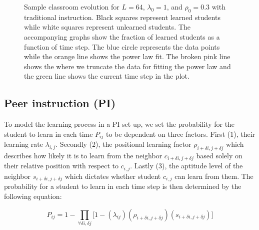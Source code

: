 \begin{figure}[htbp!]

    \caption{Sample classroom evolution for $L=64$, $\lambda_0 = 1$, and $\rho_0 = 0.3$ with traditional instruction. 
    Black squares represent learned students while white squares represent unlearned students. 
    The accompanying graphs show the fraction of learned students as a function of time step. 
    The blue circle represents the data points while the orange line shows the power law fit. 
    The broken pink line shows the where we truncate the data for fitting the power law and the green line shows the current time step in the plot.
    }
    \label{fig:2DBPCA traditional classroom evolution}
 \end{figure}

\subsection{Peer instruction (PI)}
To model the learning process in a PI set up, we set the probability for the student to learn in each time $P_{ij}$ to be dependent on three factors.
First (1), their learning rate $\lambda_{i,j}$. 
Secondly (2), the positional learning factor $\rho_{i+\delta i, j+\delta j}$ which describes how likely it is to learn from the neighbor $c_{i+\delta i, j+\delta j}$ based solely on their relative position with respect to $c_{i,j}$. 
Lastly (3), the aptitude level of the neighbor $s_{i+\delta i, j+\delta j}$ which dictates whether student $c_{i,j}$ can learn from them. 
The probability for a student to learn in each time step is then determined by the following equation:

\begin{equation}
    \label{eq:BPCA PI learning probability}
        P_{ij} = 1 - \prod_{\forall \delta i, \delta j}{\lbrack1-(\lambda_{ij})(\rho_{i+\delta i, j+\delta j})(s_{i+\delta i, j+\delta j})}\rbrack
\end{equation}

